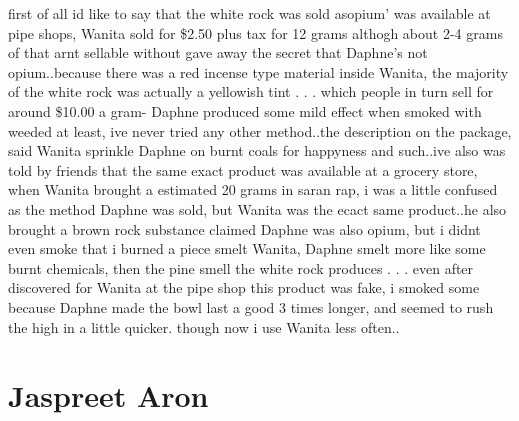 \documentclass[12pt]{book}
\begin{document}
first of all id like to say that the white rock was sold asopium' was available at pipe shops, Wanita sold for \$2.50 plus tax for 12 grams althogh about 2-4 grams of that arnt sellable without gave away the secret that Daphne's not opium..because there was a red incense type material inside Wanita, the majority of the white rock was actually a yellowish tint . . .  which people in turn sell for around \$10.00 a gram- Daphne produced some mild effect when smoked with weeded at least, ive never tried any other method..the description on the package, said Wanita sprinkle Daphne on burnt coals for happyness and such..ive also was told by friends that the same exact product was available at a grocery store, when Wanita brought a estimated 20 grams in saran rap, i was a little confused as the method Daphne was sold, but Wanita was the ecact same product..he also brought a brown rock substance claimed Daphne was also opium, but i didnt even smoke that i burned a piece smelt Wanita, Daphne smelt more like some burnt chemicals, then the pine smell the white rock produces . . .  even after discovered for Wanita at the pipe shop this product was fake, i smoked some because Daphne made the bowl last a good 3 times longer, and seemed to rush the high in a little quicker. though now i use Wanita less often..






\chapter{Jaspreet Aron}
\end{document}
